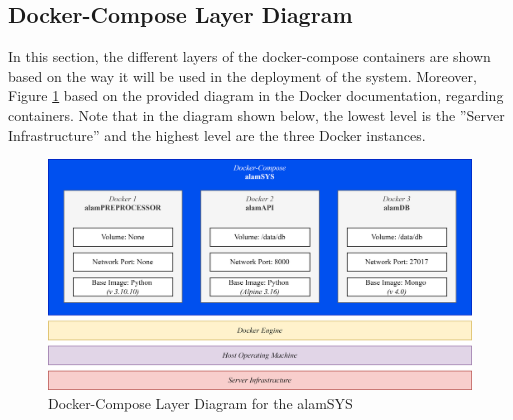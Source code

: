 \subsection{Docker-Compose Layer Diagram}
\label{subsec:docker_compose_diagram}
In this section, the different layers of the docker-compose 
containers are shown based on the way it will be used in the 
deployment of the system. Moreover, Figure \ref{fig:docker_compose_layout} 
based on the provided diagram in the Docker documentation, regarding containers. 
Note that in the diagram shown below, the lowest level is the 
”Server Infrastructure” and the highest level are the three Docker instances.
\begin{figure}[ht]
    \centering
    \includegraphics[width=1\textwidth]{./assets/Chapter_3/Docker-Compose Layout.png}
    \caption{Docker-Compose Layer Diagram for the alamSYS}
    \label{fig:docker_compose_layout}
\end{figure}
\FloatBarrier